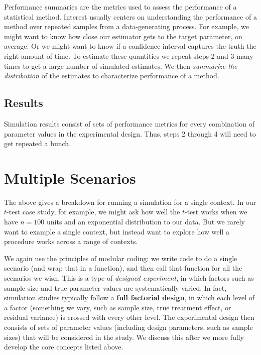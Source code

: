\documentclass[
]{book}
\begin{document}
Performance summaries are the metrics used to assess the performance of a statistical method.
Interest usually centers on understanding the performance of a method over repeated samples from a data-generating process.
For example, we might want to know how close our estimator gets to the target parameter, on average.
Or we might want to know if a confidence interval captures the truth the right amount of time.
To estimate these quantities we repeat steps 2 and 3 many times to get a large number of simulated estimates.
We then \emph{summarize the distribution} of the estimates to characterize performance of a method.

\hypertarget{results}{%
\subsection{Results}\label{results}}

Simulation results consist of sets of performance metrics for every combination of parameter values in the experimental design. Thus, steps 2 through 4 will need to get repeated a bunch.

\hypertarget{multiple-scenarios}{%
\section{Multiple Scenarios}\label{multiple-scenarios}}

The above gives a breakdown for running a simulation for a single context.
In our \(t\)-test case study, for example, we might ask how well the \(t\)-test works when we have \(n=100\) units and an exponential distribution to our data.
But we rarely want to example a single context, but instead want to explore how well a procedure works across a range of contexts.

We again use the principles of modular coding: we write code to do a single scenario (and wrap that in a function), and then call that function for all the scenarios we wish.
This is a type of \emph{designed experiment}, in which factors such as sample size and true parameter values are systematically varied.
In fact, simulation studies typically follow a \textbf{full factorial design}, in which each level of a factor (something we vary, such as sample size, true treatment effect, or residual variance) is crossed with every other level.
The experimental design then consists of sets of parameter values (including design parameters, such as sample sizes) that will be considered in the study.
We discuss this after we more fully develop the core concepts listed above.
\end{document}

